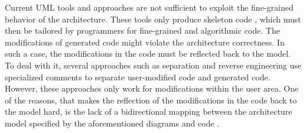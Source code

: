 

Current UML tools and approaches are not sufficient to exploit the fine-grained behavior of the architecture. 
These tools only produce skeleton code \cite{zheng2013classification}, which must then be tailored by programmers for fine-grained and algorithmic code. 
The modifications of generated code might violate the architecture correctness.
In such a case, the modifications in the code must be reflected back to the model. 
To deal with it, several approaches such as separation \cite{steinberg2008emf} and reverse engineering \cite{ibm_rhapsody} use specialized comments to separate user-modified code and generated code.
However, these approaches only work for modifications within the user area.
One of the reasons, that makes the reflection of the modifications in the code back to the model hard, is the lack of a bidirectional mapping between the architecture model specified by the aforementioned diagrams and code \cite{ubayashi2010archface}.

